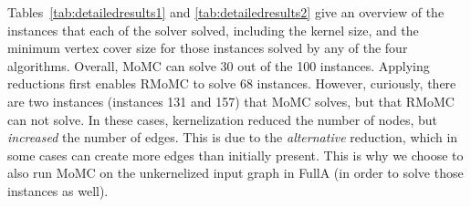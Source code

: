 \documentclass[twoside,leqno,twocolumn]{article}
\newcommand{\AlgName}[1]{\textsf{#1}}
\begin{document}

Tables~\ref{tab:detailedresults1} and \ref{tab:detailedresults2} give an overview of the instances that each of the solver solved, including the kernel size, and the minimum vertex cover size for those instances solved by any of the four algorithms.
Overall, \AlgName{MoMC} can solve 30 out of the 100 instances. 
Applying reductions first enables \AlgName{RMoMC} to solve 68 instances. However, curiously, there are two instances (instances 131 and 157) that \AlgName{MoMC} solves, but that \AlgName{RMoMC} can not solve. 
In these cases, kernelization reduced the number of nodes, but \emph{increased} the number of edges. This is due to the \emph{alternative} reduction, which in some cases can create more edges than initially present. This is why we choose to also run MoMC on the unkernelized input graph in \AlgName{FullA} (in order to solve those instances as well).
\end{document}
